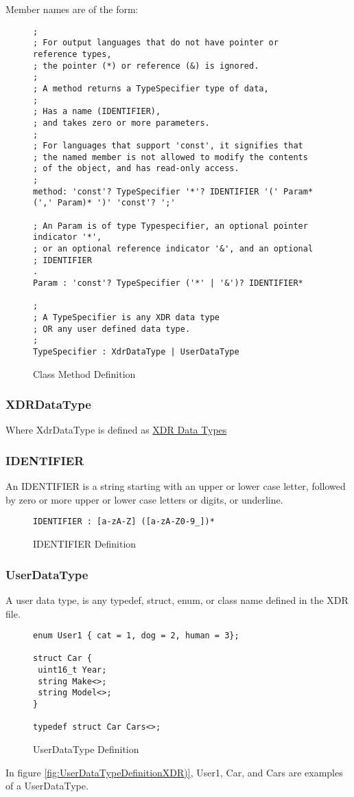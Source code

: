 Member names are of the form:
\begin{figure}
\begin{verbatim}
;
; For output languages that do not have pointer or reference types,
; the pointer (*) or reference (&) is ignored.
;
; A method returns a TypeSpecifier type of data,
;
; Has a name (IDENTIFIER),
; and takes zero or more parameters.
;
; For languages that support 'const', it signifies that
; the named member is not allowed to modify the contents
; of the object, and has read-only access.
;
method: 'const'? TypeSpecifier '*'? IDENTIFIER '(' Param* (',' Param)* ')' 'const'? ';'

; An Param is of type Typespecifier, an optional pointer indicator '*',
; or an optional reference indicator '&', and an optional
; IDENTIFIER
.
Param : 'const'? TypeSpecifier ('*' | '&')? IDENTIFIER*

;
; A TypeSpecifier is any XDR data type
; OR any user defined data type.
;
TypeSpecifier : XdrDataType | UserDataType
\end{verbatim}
\caption{Class Method Definition}
\label{fig:ClassIntroXDR}
\end{figure}

\subsubsection{XDRDataType}
Where XdrDataType is defined
as \href {https://datatracker.ietf.org/doc/html/rfc4506#page-4}{XDR Data Types}

\subsubsection{IDENTIFIER}
An IDENTIFIER is a string starting with an upper or lower
case letter, followed by zero or more upper or lower case
letters or digits, or underline.

\begin{figure}
\begin{verbatim}
IDENTIFIER : [a-zA-Z] ([a-zA-Z0-9_])*
\end{verbatim}
\caption{IDENTIFIER Definition}
\label{fig:IDENTIFIERDefinitionXDR}
\end{figure}

\subsubsection{UserDataType}
A user data type, is any typedef, struct, enum, or class
name defined in the XDR file.
\begin{figure}
\begin{verbatim}
enum User1 { cat = 1, dog = 2, human = 3};

struct Car {
 uint16_t Year;
 string Make<>;
 string Model<>;
}

typedef struct Car Cars<>;
\end{verbatim}
\caption{UserDataType Definition}
\label{fig:UserDataTypeDefinitionXDR}
\end{figure}

In figure \ref{fig:UserDataTypeDefinitionXDR)}, User1, Car, and Cars
are examples of a UserDataType.

